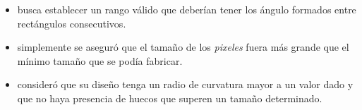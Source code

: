 \begin{itemize}

  \item \cite{Prosopio-Galarza2019} busca establecer un rango válido que deberían tener los ángulo formados entre rectángulos consecutivos.

  \item \cite{Su2020} simplemente se aseguró que el tamaño de los \emph{pixeles} fuera más grande que el mínimo tamaño que se podía fabricar.

  \item \cite{Piggott2017} consideró que su diseño tenga un radio de curvatura mayor a un valor dado y que no haya presencia de huecos que superen un tamaño determinado.

\end{itemize}


